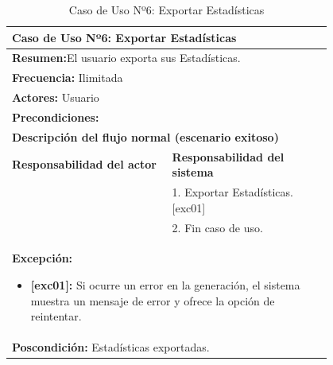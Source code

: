 \begin{table}[H]
    \centering
    \caption{Caso de Uso Nº6: Exportar Estadísticas}
    \vspace{10pt}
    
    \begin{tabular}{| p{0.4\linewidth} | p{0.4\linewidth} |}
        \hline
        \multicolumn{2}{|l|}{\textbf{Caso de Uso Nº6:} Exportar Estadísticas} \\
        \hline
        \multicolumn{2}{|l|}{\textbf{Resumen:}El usuario exporta sus Estadísticas.} \\
        \hline
        \multicolumn{2}{|l|}{\textbf{Frecuencia:}  Ilimitada} \\
        \hline
        \multicolumn{2}{|l|}{\textbf{Actores:}  Usuario} \\
        \hline
        \multicolumn{2}{|l|}{\textbf{Precondiciones:}} \\
        \hline
        \multicolumn{2}{|l|}{\textbf{Descripción del flujo normal (escenario exitoso)} } \\
        \hline
        \textbf{Responsabilidad del actor} & \textbf{Responsabilidad del sistema}\\
            & 1. Exportar Estadísticas. [exc01]\\
            & 2. Fin caso de uso. \\
        \hline
        \multicolumn{2}{|p{0.8\linewidth}|}{
            \textbf{Excepción:}
            \begin{itemize}
                \item \textbf{[exc01]:} Si ocurre un error en la generación, el sistema muestra un mensaje de error y ofrece la opción de reintentar.
            \end{itemize}}\\
        \hline
        \multicolumn{2}{|l|}{\textbf{Poscondición:}  Estadísticas exportadas.} \\
        \hline
    \end{tabular}

    \label{table:6}
\end{table}

